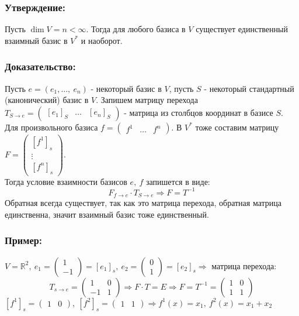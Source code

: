 \documentclass[12pt, letterpaper, twoside]{article}
\newcommand{\mb}[1]{\mathbb{#1}}
\newcommand{\oo}{\infty}
\begin{document}
\subsubsection*{Утверждение:}
    Пусть $\dim V = n < \oo$. Тогда для любого базиса в $V$ существует единственный взаимный базис  в $V^*$ и наоборот.
\subsubsection*{Доказательство:}
    Пусть $e = (e_1,\dots,\ e_n)$ - некоторый базис в $V$, пусть $S$ - некоторый стандартный (канонический) базис в $V$. Запишем матрицу перехода $T_{S\to e} = \begin{pmatrix}
        [e_1]_S & \dots & [e_n]_S
    \end{pmatrix}$ - матрица из столбцов координат в базисе $S$.\\
    Для произвольного базиса $f = \begin{pmatrix}
        f^1 & \dots & f^n
    \end{pmatrix}$. В $V^*$ тоже составим матрицу $F =\begin{pmatrix}
        [f^1]_s\\
        \vdots\\
        [f^n]_s
    \end{pmatrix}$.\\
    Тогда условие взаимности базисов $e,\ f$ запишется в виде:
\[ F_{f\to e}\cdot T_{S\to e}\Rightarrow F = T^{-1}\]
    Обратная всегда существует, так как это матрица перехода, обратная матрица единственна, значит взаимный базис тоже единственный.
\subsubsection*{Пример:}
    $V = \mb{R}^2,\ e_1 = \begin{pmatrix}
        1\\-1
    \end{pmatrix} = [e_1]_s,\ e_2 = \begin{pmatrix}
        0\\ 1
    \end{pmatrix} = [e_2]_s \Rightarrow$ матрица перехода:
\[T_{s\to e} = \begin{pmatrix}
    1 & 0\\
    -1 & 1
\end{pmatrix}\Rightarrow F\cdot T = E\Rightarrow F = T^{-1} = \begin{pmatrix}
    1 & 0\\
    1 & 1
\end{pmatrix}\]
    $[f^1]_s = \begin{pmatrix}
        1 & 0
    \end{pmatrix},\ [f^2]_s = \begin{pmatrix}
        1 & 1
    \end{pmatrix}\Rightarrow f^1(x) = x_1,\ f^2(x) = x_1 + x_2$
\end{document}
